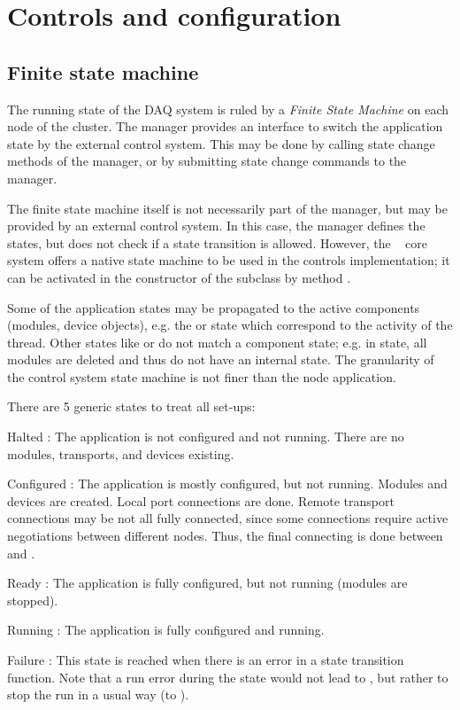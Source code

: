                
\section{Controls and configuration}
\subsection{Finite state machine}
\label{prog_fsm}

The running state of the DAQ system is ruled by a {\sl Finite State Machine} 
\cite{Wikipedia-Statemachine} 
on  each node of the cluster. The manager provides an interface to switch the application 
state by the external control system. This may be done by calling 
state change methods of the manager, or by submitting state change commands 
to the manager.

The finite state machine itself is not necessarily part of the manager,
but may be provided by an external control system. In this case,
the manager defines the states, but does not check if a state transition is allowed. 
However, the \dabc~ core system offers a native state machine to be used
in the controls implementation; it can be
activated in the constructor of the  subclass 
by method .      
      
Some of the application states may be propagated to the 
active components (modules, device objects), e.g. the 
 or  state which correspond to the activity of the thread. 
Other states like  or  do not match a component state; 
e.g. in  state, all modules are deleted and thus do not 
have an internal state. The granularity of the control system state 
machine is not finer than the node application.





There are 5 generic states to treat all set-ups: 
\begin{compactdesc}
\item[Halted] : The application is not configured and not running. 
	 There are no modules, transports, and devices existing.
\item[Configured] : The application is mostly configured, but not running. 
	 Modules and devices are created. Local port connections are done.
	  Remote transport connections may be not all fully connected, 
	  since some connections require active negotiations between different nodes. 
	  Thus, the final connecting is done between 
	   and .  
\item[Ready] : The application is fully configured, but not running 
	 (modules are stopped).
\item[Running] : The application is fully configured and running.
\item[Failure] : This state is reached when there is an error in a 
	 state transition function. Note that a run error during the 
	  state would not lead to , but rather to stop 
	 the run in a usual way (to ).
\end{compactdesc}


